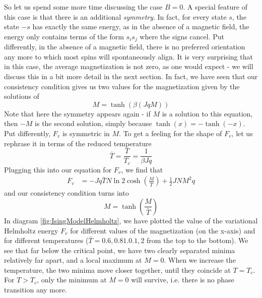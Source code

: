 \documentclass[a4paper, draft]{article}
\theoremstyle{own}
\theoremstyle{remark}
\begin{document}
So let us spend some more time discussing the case $B = 0$. A special feature of this case is that there is an additional {\em symmetry}. In fact, for every state $s$, the state $-s$ has exactly the same energy, as in the absence of a magnetic field, the energy only contains terms of the form $s_i s_j$ where the signs cancel. Put differently, in the absence of a magnetic field, there is no preferred orientation any more to which most spins will spontaneously align. It is very surprising that in this case, the average magnetization is not zero, as one would expect - we will discuss this in a bit more detail in the next section. In fact, we have seen that our consistency condition gives us two values for the magnetization given by the solutions of
$$
M = \tanh(\beta(Jq M))
$$
Note that here the symmetry appears again - if $M$ is a solution to this equation, then $-M$ is the second solution, simply because $\tanh (x) = - \tanh (-x)$. Put differently, $F_v$ is symmetric in $M$. To get a feeling for the shape of $F_v$, let us rephrase it in terms of the reduced temperature 
$$
\bar{T} = \frac{T}{T_c} = \frac{1}{\beta Jq}
$$
Plugging this into our equation for $F_v$, we find that
\begin{align*}
F_v &= - Jq \bar{T}  N \ln 2 \cosh(\frac{M}{\bar{T}} )  + \frac{1}{2} J N M^2 q
\end{align*}
and our consistency condition turns into
$$
M = \tanh(\frac{M}{\bar{T}})
$$
In diagram \ref{fig:IsingModelHelmholtz}, we have plotted the value of the variational Helmholtz energy $F_v$ for different values of the magnetization (on the x-axis) and for different temperatures ($\bar{T} = 0.6, 0.8 1.0. 1,2$ from the top to the bottom). We see that far below the critical point, we have two clearly separated minima relatively far apart, and a local maximum at $M = 0$. When we increase the temperature, the two minima move closer together, until they coincide at $T = T_c$. For $T > T_c$, only the minimum at $M = 0$ will survive, i.e. there is no phase transition any more.
\end{document}
